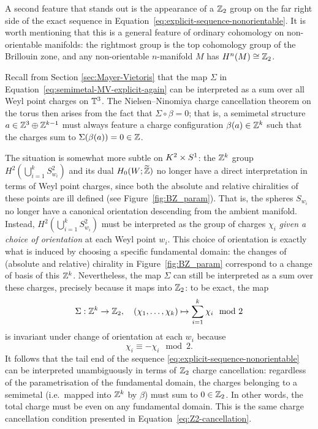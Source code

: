 A second feature that stands out is the appearance of a $\mathbb{Z}_2$ group on the far right side of the exact sequence in Equation~\eqref{eq:explicit-sequence-nonorientable}. It is worth mentioning that this is a general feature of ordinary cohomology on non-orientable manifolds: the rightmost group is the top cohomology group of the Brillouin zone, and any non-orientable $n$-manifold $M$ has $H^n(M)\cong\mathbb{Z}_2$.

Recall from Section \ref{sec:Mayer-Vietoris} that the map $\Sigma$ in Equation~\eqref{eq:semimetal-MV-explicit-again} can be interpreted as a sum over all Weyl point charges on $\mathbb{T}^3$. The Nielsen--Ninomiya charge cancellation theorem on the torus then arises from the fact that $\Sigma\circ\beta = 0$; that is, a semimetal structure $a\in\mathbb{Z}^3\oplus\mathbb{Z}^{k-1}$ must always feature a charge configuration $\beta(a)\in\mathbb{Z}^k$ such that the charges sum to $\Sigma(\beta(a)) = 0 \in \mathbb{Z}$.

The situation is somewhat more subtle on $K^2\times S^1$: the $\mathbb{Z}^k$ group $H^2\!\left(\bigcup_{i=1}^k S_{w_i}^2\right)$ and its dual $H_0(W;\widetilde{\mathbb{Z}})$ no longer have a direct interpretation in terms of Weyl point charges, since both the absolute and relative chiralities of these points are ill defined (see Figure~\ref{fig:BZ_param}). That is, the spheres $S_{w_i}$ no longer have a canonical orientation descending from the ambient manifold. Instead, $H^2\!\left(\bigcup_{i=1}^k S_{w_i}^2\right)$ must be interpreted as the group of charges $\chi_i$ \emph{given a choice of orientation} at each Weyl point $w_i$. This choice of orientation is exactly what is induced by choosing a specific fundamental domain: the changes of (absolute and relative) chirality in Figure~\ref{fig:BZ_param} correspond to a change of basis of this $\mathbb{Z}^k$. Nevertheless, the map $\Sigma$ can still be interpreted as a sum over these charges, precisely because it maps into $\mathbb{Z}_2$: to be exact, the map
\begin{equation}\label{eq:map-sigma}
	\Sigma: \mathbb{Z}^k\to\mathbb{Z}_2,\quad (\chi_1,\ldots,\chi_k) \mapsto \sum_{i=1}^{k}\chi_i \mod 2
\end{equation}
is invariant under change of orientation at each $w_i$ because
\begin{equation*}
	\chi_i \equiv -\chi_i \mod 2.
\end{equation*}
It follows that the tail end of the sequence \eqref{eq:explicit-sequence-nonorientable} can be interpreted unambiguously in terms of $\mathbb{Z}_2$ charge cancellation: regardless of the parametrisation of the fundamental domain, the charges belonging to a semimetal (i.e.\ mapped into $\mathbb{Z}^k$ by $\beta$) must sum to $0\in\mathbb{Z}_2$. In other words, the total charge must be even on any fundamental domain. This is the same charge cancellation condition presented in Equation~\eqref{eq:Z2-cancellation}. %

